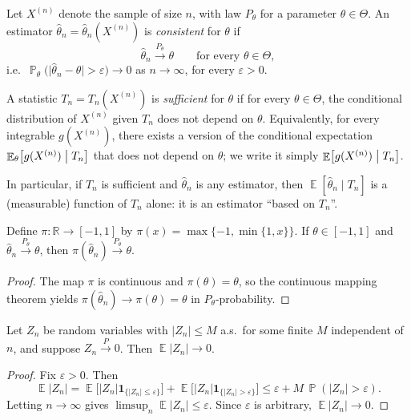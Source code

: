 \documentclass[11pt,a4paper]{article}
\DeclareMathOperator{\E}{\mathbb{E}}
\DeclareMathOperator{\Pbb}{\mathbb{P}}
\begin{document}
Let \(X^{(n)}\) denote the sample of size \(n\), with law \(P_\theta\) for a parameter \(\theta\in\Theta\). An estimator \(\hat\theta_n=\hat\theta_n(X^{(n)})\) is \emph{consistent} for \(\theta\) if
\[
\hat\theta_n\xrightarrow{P_\theta}\theta
\qquad\text{for every }\theta\in\Theta,
\]
i.e.\ \(\Pbb_\theta\bigl(\lvert\hat\theta_n-\theta\rvert>\varepsilon\bigr)\to 0\) as \(n\to\infty\), for every \(\varepsilon>0\).

\begin{definition}[Sufficiency]
\label{def:p7-suff}
A statistic \(T_n=T_n(X^{(n)})\) is \emph{sufficient} for \(\theta\) if for every \(\theta\in\Theta\), the conditional distribution of \(X^{(n)}\) given \(T_n\) does not depend on \(\theta\). Equivalently, for every integrable \(g(X^{(n)})\), there exists a version of the conditional expectation \(\E_\theta\bigl[g(X^{(n)})\bigm|T_n\bigr]\) that does not depend on \(\theta\); we write it simply \(\E\bigl[g(X^{(n)})\bigm|T_n\bigr]\).
\end{definition}

In particular, if \(T_n\) is sufficient and \(\hat\theta_n\) is any estimator, then \(\E[\hat\theta_n\mid T_n]\) is a (measurable) function of \(T_n\) alone: it is an estimator ``based on \(T_n\)''.

\begin{lemma}
\label{lem:p7-proj}
Define \(\pi:\mathbb{R}\to[-1,1]\) by \(\pi(x)=\max\{-1,\min\{1,x\}\}\). If \(\theta\in[-1,1]\) and \(\hat\theta_n\xrightarrow{P_\theta}\theta\), then \(\pi(\hat\theta_n)\xrightarrow{P_\theta}\theta\).
\end{lemma}

\begin{proof}
The map \(\pi\) is continuous and \(\pi(\theta)=\theta\), so the continuous mapping theorem yields \(\pi(\hat\theta_n)\to\pi(\theta)=\theta\) in \(P_\theta\)-probability.
\end{proof}

\begin{lemma}
\label{lem:p7-L1}
Let \(Z_n\) be random variables with \(\lvert Z_n\rvert\le M\) a.s.\ for some finite \(M\) independent of \(n\), and suppose \(Z_n\xrightarrow{P}0\). Then \(\E\lvert Z_n\rvert\to 0\).
\end{lemma}

\begin{proof}
Fix \(\varepsilon>0\). Then
\[
\E\lvert Z_n\rvert
=
\E\bigl[\lvert Z_n\rvert\mathbf{1}_{\{\lvert Z_n\rvert\le\varepsilon\}}\bigr]
+
\E\bigl[\lvert Z_n\rvert\mathbf{1}_{\{\lvert Z_n\rvert>\varepsilon\}}\bigr]
\le
\varepsilon
+
M\,\Pbb(\lvert Z_n\rvert>\varepsilon).
\]
Letting \(n\to\infty\) gives \(\limsup_n\E\lvert Z_n\rvert\le\varepsilon\). Since \(\varepsilon\) is arbitrary, \(\E\lvert Z_n\rvert\to 0\).
\end{proof}
\end{document}
